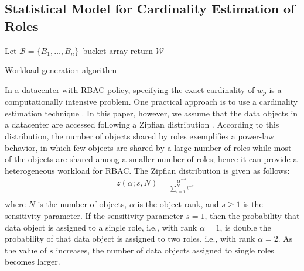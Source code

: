 \subsection{Statistical Model for Cardinality Estimation of Roles}
\begin{algorithm}[t!]
\small
{}
    Let $\mathcal{B} = \{B_1, \ldots, B_n\}$\  bucket array\; 
    return $\mathcal{W}$
   
\caption{Workload generation algorithm}

\label{alg:workload}
\end{algorithm}


In a datacenter with RBAC policy, specifying the exact cardinality of $w_p$ is a computationally intensive problem. One practical approach is to use a cardinality estimation technique \cite{zhang2009psalm}. In this paper, however, we assume that the data objects in a datacenter are accessed following a Zipfian distribution \cite{cooper2010benchmarking}. According to this distribution, the number of objects shared by roles exemplifies a power-law behavior, in which few objects are shared by a large number of roles while most of the objects are shared among a smaller number of roles; hence it can provide a heterogeneous workload for RBAC. The Zipfian distribution is given as follows:
\begin{equation}
\label{eq:zipf}
\begin{split}
&z(\alpha;s,N) = \frac{\alpha^{-s}}{\sum_{i=1}^N i^{-s}} \\
\end{split}
\end{equation}
where $N$ is the number of objects, $\alpha$ is the object rank, and $s \geq 1$ is the sensitivity parameter. If the sensitivity parameter $s=1$, then the probability that data object is assigned to a single role, i.e., with rank  $\alpha= 1$, is double the probability of that data object is assigned to two roles, i.e., with rank $\alpha =2$. As the value of $s$ increases, the number of data objects assigned to single roles becomes larger. 

